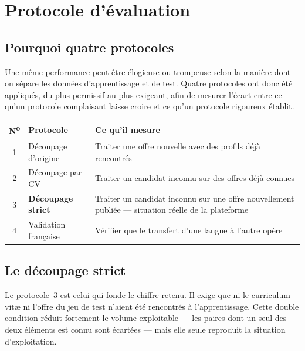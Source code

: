 \documentclass[11pt,a4paper]{article}
\begin{document}
\section{Protocole d'évaluation}

\subsection{Pourquoi quatre protocoles}
Une même performance peut être élogieuse ou trompeuse selon la manière dont on sépare les données d'apprentissage et de test. Quatre protocoles ont donc été appliqués, du plus permissif au plus exigeant, afin de mesurer l'écart entre ce qu'un protocole complaisant laisse croire et ce qu'un protocole rigoureux établit.

\begin{center}
\small
\begin{tabular}{clp{7.6cm}}
  \toprule
  \textbf{N\textsuperscript{o}} & \textbf{Protocole} & \textbf{Ce qu'il mesure} \\
  \midrule
  1 & Découpage d'origine & Traiter une offre nouvelle avec des profils déjà rencontrés \\[1mm]
  2 & Découpage par CV & Traiter un candidat inconnu sur des offres déjà connues \\[1mm]
  3 & \textbf{Découpage strict} & Traiter un candidat inconnu sur une offre nouvellement publiée --- situation réelle de la plateforme \\[1mm]
  4 & Validation française & Vérifier que le transfert d'une langue à l'autre opère \\
  \bottomrule
\end{tabular}
\end{center}

\subsection{Le découpage strict}
Le protocole~3 est celui qui fonde le chiffre retenu. Il exige que ni le curriculum vitæ ni l'offre du jeu de test n'aient été rencontrés à l'apprentissage. Cette double condition réduit fortement le volume exploitable — les paires dont un seul des deux éléments est connu sont écartées — mais elle seule reproduit la situation d'exploitation.
\end{document}
